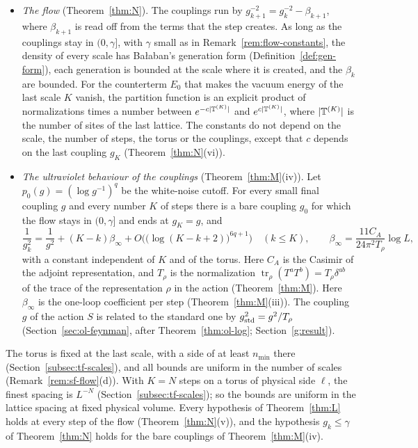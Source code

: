 \begin{itemize}
\item \emph{The flow} (Theorem~\ref{thm:N}). The couplings run by $g_{k+1}^{-2}=g_k^{-2}-\beta_{k+1}$, where $\beta_{k+1}$ is read off from the terms that the step creates. As long as the couplings stay in $(0,\gamma]$, with $\gamma$ small as in Remark~\ref{rem:flow-constants}, the density of every scale has Ba\l aban's generation form (Definition~\ref{def:gen-form}), each generation is bounded at the scale where it is created, and the $\beta_k$ are bounded. For the counterterm $E_0$ that makes the vacuum energy of the last scale $K$ vanish, the partition function is an explicit product of normalizations times a number between $e^{-c|\mathbb T^{(K)}|}$ and $e^{c|\mathbb T^{(K)}|}$, where $|\mathbb T^{(K)}|$ is the number of sites of the last lattice. The constants do not depend on the scale, the number of steps, the torus or the couplings, except that $c$ depends on the last coupling $g_K$ (Theorem~\ref{thm:N}(vi)).
\item \emph{The ultraviolet behaviour of the couplings} (Theorem~\ref{thm:M}(iv)). Let $p_0(g)=(\log g^{-1})^q$ be the white-noise cutoff. For every small final coupling $g$ and every number $K$ of steps there is a bare coupling $g_0$ for which the flow stays in $(0,\gamma]$ and ends at $g_K=g$, and
\[
\frac1{g_k^2}=\frac1{g^2}+(K-k)\beta_\infty+O\Big(\big(\log(K-k+2)\big)^{6q+1}\Big)\quad(k\le K),\qquad\beta_\infty=\frac{11C_A}{24\pi^2T_\rho}\log L,
\]
with a constant independent of $K$ and of the torus. Here $C_A$ is the Casimir of the adjoint representation, and $T_\rho$ is the normalization $\operatorname{tr}_\rho(T^aT^b)=T_\rho\delta^{ab}$ of the trace of the representation $\rho$ in the action (Theorem~\ref{thm:M}). Here $\beta_\infty$ is the one-loop coefficient per step (Theorem~\ref{thm:M}(iii)). The coupling $g$ of the action $S$ is related to the standard one by $g_{\rm std}^2=g^2/T_\rho$ (Section~\ref{sec:ol-feynman}, after Theorem~\ref{thm:ol-log}; Section~\ref{g:result}).
\end{itemize}
The torus is fixed at the last scale, with a side of at least $n_{\min}$ there (Section~\ref{subsec:tf-scales}), and all bounds are uniform in the number of scales (Remark~\ref{rem:sf-flow}(d)). With $K=N$ steps on a torus of physical side $\ell$, the finest spacing is $L^{-N}$ (Section~\ref{subsec:tf-scales}); so the bounds are uniform in the lattice spacing at fixed physical volume. Every hypothesis of Theorem~\ref{thm:L} holds at every step of the flow (Theorem~\ref{thm:N}(v)), and the hypothesis $g_k\le\gamma$ of Theorem~\ref{thm:N} holds for the bare couplings of Theorem~\ref{thm:M}(iv).

